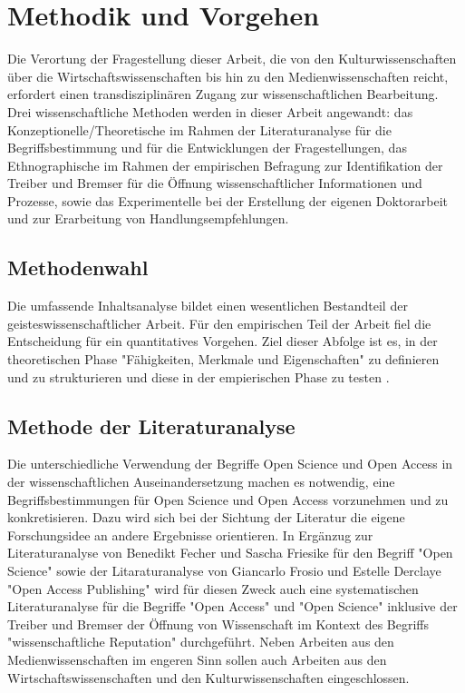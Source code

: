 \chapter{Methodik und Vorgehen}
Die Verortung der Fragestellung dieser Arbeit, die von den Kulturwissenschaften über die Wirtschaftswissenschaften bis hin zu den Medienwissenschaften reicht, erfordert einen transdisziplinären Zugang zur wissenschaftlichen Bearbeitung. Drei wissenschaftliche Methoden werden in dieser Arbeit angewandt: das Konzeptionelle/Theoretische im Rahmen der Literaturanalyse für die Begriffsbestimmung und für die Entwicklungen der Fragestellungen, das Ethnographische im Rahmen der empirischen Befragung zur Identifikation der Treiber und Bremser für die Öffnung wissenschaftlicher Informationen und Prozesse, sowie das Experimentelle bei der Erstellung der eigenen Doktorarbeit und zur Erarbeitung von Handlungsempfehlungen. 

\section{Methodenwahl}

Die umfassende Inhaltsanalyse bildet einen wesentlichen Bestandteil der geisteswissenschaftlicher Arbeit. Für den empirischen Teil der Arbeit fiel die Entscheidung für ein quantitatives Vorgehen. Ziel dieser Abfolge ist es, in der theoretischen Phase "Fähigkeiten, Merkmale und Eigenschaften" zu definieren und zu strukturieren und diese in der empierischen Phase zu testen \cite{raab_2012_fragebogen}.

\section{Methode der Literaturanalyse}
Die unterschiedliche Verwendung der Begriffe Open Science und Open Access in der wissenschaftlichen Auseinandersetzung machen es notwendig, eine Begriffsbestimmungen für Open Science und Open Access vorzunehmen und zu konkretisieren. Dazu wird sich bei der Sichtung der Literatur die eigene Forschungsidee an andere Ergebnisse orientieren. In Ergänzug zur Literaturanalyse von Benedikt Fecher und Sascha Friesike für den Begriff "Open Science"\cite{cite:9} sowie der Litaraturanalyse von Giancarlo Frosio und Estelle Derclaye "Open Access Publishing" \cite{CREATe_2014} wird für diesen Zweck auch eine systematischen Literaturanalyse für die Begriffe "Open Access" und "Open Science" inklusive der Treiber und Bremser der Öffnung von Wissenschaft im Kontext des Begriffs "wissenschaftliche Reputation" durchgeführt. Neben Arbeiten aus den Medienwissenschaften im engeren Sinn sollen auch Arbeiten aus den Wirtschaftswissenschaften und den Kulturwissenschaften eingeschlossen.

